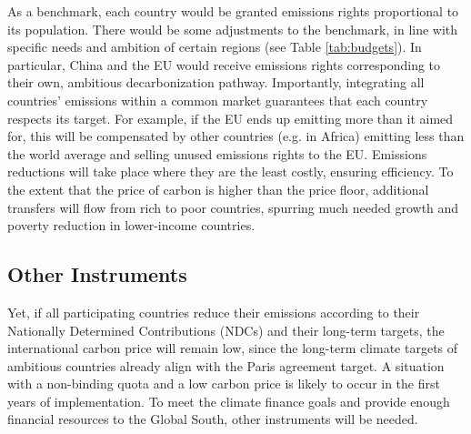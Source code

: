 \documentclass[12pt,english]{article}
\begin{document}
\begin{bibunit}
As a benchmark, each country would be granted emissions rights proportional to its population. There would be some adjustments to the benchmark, in line with specific needs and ambition of certain regions (see Table \ref{tab:budgets}). In particular, China and the EU would receive emissions rights corresponding to their own, ambitious decarbonization pathway. Importantly, integrating all countries' emissions within a common market guarantees that each country respects its target. For example, if the EU ends up emitting more than it aimed for, this will be compensated by other countries (e.g. in Africa) emitting less than the world average and selling unused emissions rights to the EU. Emissions reductions will take place where they are the least costly, ensuring efficiency. To the extent that the price of carbon is higher than the price floor, additional transfers will flow from rich to poor countries, spurring much needed growth and poverty reduction in lower-income countries. 

\begin{table}[h]
  \caption{Carbon budget over 2030-2080 (in GtCO$_\text{2}$): budgets proposed and equal per capita budgets.\label{tab:budgets}} 
\end{table}

\subsection*{Other Instruments}
Yet, if all participating countries reduce their emissions according to their Nationally Determined Contributions (NDCs) and their long-term targets, the international carbon price will remain low, since the long-term climate targets of ambitious countries already align with the Paris agreement target. A situation with a non-binding quota and a low carbon price is likely to occur in the first years of implementation. To meet the climate finance goals and provide enough financial resources to the Global South, other instruments will be needed. 


\end{bibunit}
\end{document}
